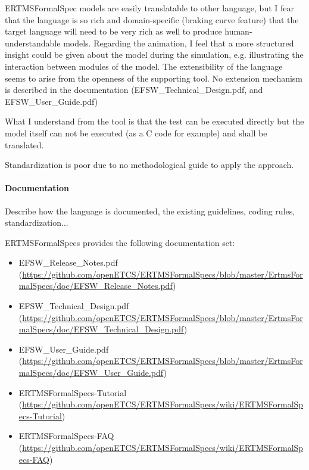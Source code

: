\begin{assessor1}
ERTMSFormalSpec models are easily translatable to other language, but I fear that the language is so rich and domain-specific (braking curve feature) that the target language will need to be very rich as well to produce human-understandable models. Regarding the animation, I feel that a more structured insight could be given about the model during the simulation, e.g. illustrating the interaction between modules of the model. The extensibility of the language seems to arise from the openness of the supporting tool. No extension mechanism is described in the documentation (EFSW\_Technical\_Design.pdf, and EFSW\_User\_Guide.pdf)
\end{assessor1}


\begin{assessor2}
What I understand from the tool is that the test can be executed directly but the model itself can not be executed (as a C code for example)  and shall be translated.

Standardization is poor due to no methodological guide to apply the approach.
\end{assessor2}

\paragraph{Documentation} Describe how the language is documented, the existing guidelines, coding rules, standardization...

ERTMSFormalSpecs provides the following documentation set:

\begin{itemize}
	\item EFSW\_Release\_Notes.pdf (\url{https://github.com/openETCS/ERTMSFormalSpecs/blob/master/ErtmsFormalSpecs/doc/EFSW\_Release\_Notes.pdf})
	\item EFSW\_Technical\_Design.pdf (\url{https://github.com/openETCS/ERTMSFormalSpecs/blob/master/ErtmsFormalSpecs/doc/EFSW\_Technical\_Design.pdf})
	\item EFSW\_User\_Guide.pdf (\url{https://github.com/openETCS/ERTMSFormalSpecs/blob/master/ErtmsFormalSpecs/doc/EFSW\_User\_Guide.pdf})
	\item ERTMSFormalSpecs-Tutorial (\url{https://github.com/openETCS/ERTMSFormalSpecs/wiki/ERTMSFormalSpecs-Tutorial})
	\item ERTMSFormalSpecs-FAQ (\url{https://github.com/openETCS/ERTMSFormalSpecs/wiki/ERTMSFormalSpecs-FAQ})
\end{itemize}

